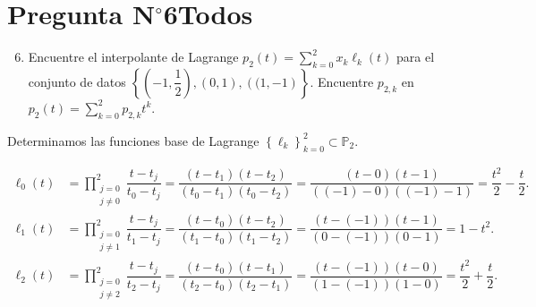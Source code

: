 \section{Pregunta N$^{\circ}$6\qquad Todos}


% 

\begin{frame}
	\begin{enumerate}\setcounter{enumi}{5}
		\item

		      Encuentre el interpolante de Lagrange
		      \begin{math}
			      p_{2}\left(t\right)=
			      \sum\limits_{k=0}^{2}
			      x_{k}
			      \ell_{k}\left(t\right)
		      \end{math}
		      para el conjunto de datos
		      \begin{math}
			      \left\{
			      \left(-1,\dfrac{1}{2}\right),
			      \left(0,1\right),
			      \left((1,-1\right)
			      \right\}
		      \end{math}.
		      Encuentre $p_{2,k}$ en
		      \begin{math}
			      p_{2}\left(t\right)=
			      \sum\limits_{k=0}^{2}
			      p_{2,k}t^{k}
		      \end{math}.
	\end{enumerate}

	\begin{solution}
		Determinamos las funciones base de Lagrange
		\begin{math}
			{\left\{\ell_{k}\right\}}^{2}_{k=0}\subset\mathbb{P}_{2}
		\end{math}.

		\begin{align*}
			\ell_{0}\left(t\right) & =
			\prod\limits_{\substack{j=0    \\j\neq 0}}^{2}
			\dfrac{t-t_{j}}{t_{0}-t_{j}}=
			\dfrac{
				\left(t-t_{1}\right)
				\left(t-t_{2}\right)
			}{
				\left(t_{0}-t_{1}\right)
				\left(t_{0}-t_{2}\right)
			}=
			\dfrac{
				\left(t-0\right)
				\left(t-1\right)
			}{
				\left(\left(-1\right)-0\right)
				\left(\left(-1\right)-1\right)
			}=
			\dfrac{t^{2}}{2}-\dfrac{t}{2}. \\
			\ell_{1}\left(t\right) & =
			\prod\limits_{\substack{j=0    \\j\neq 1}}^{2}
			\dfrac{t-t_{j}}{t_{1}-t_{j}}=
			\dfrac{
				\left(t-t_{0}\right)
				\left(t-t_{2}\right)
			}{
				\left(t_{1}-t_{0}\right)
				\left(t_{1}-t_{2}\right)}=
			\dfrac{
				\left(t-\left(-1\right)\right)
				\left(t-1\right)
			}{
				\left(0-\left(-1\right)\right)
				\left(0-1\right)
			}=
			1-t^{2}.                       \\
			\ell_{2}\left(t\right) & =
			\prod\limits_{\substack{j=0    \\j\neq 2}}^{2}
			\dfrac{t-t_{j}}{t_{2}-t_{j}}=
			\dfrac{
				\left(t-t_{0}\right)
				\left(t-t_{1}\right)
			}{
				\left(t_{2}-t_{0}\right)
				\left(t_{2}-t_{1}\right)
			}=
			\dfrac{
				\left(t-\left(-1\right)\right)
				\left(t-0\right)
			}{
				\left(1-\left(-1\right)\right)
				\left(1-0\right)
			}=
			\dfrac{t^{2}}{2}+\dfrac{t}{2}.
		\end{align*}


\end{solution}
\end{frame}
